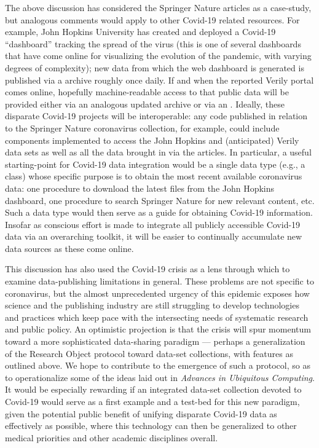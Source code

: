 \documentclass[11pt,letterpaper]{article}
\newcommand{\GIT}{\resizebox{!}{7.5pt}{\AcronymText{GIT}}}
\newcommand{\API}{\resizebox{!}{7.5pt}{\AcronymText{API}}}
\newcommand{\textscc}[1]{{\color{orr!35!black}{{%
						\fontfamily{Cabin-TLF}\fontseries{b}\selectfont{\textsc{\scriptsize{#1}}}}}}}
\newcommand{\AcronymText}[1]{{\textscc{#1}}}
\newcommand{\Cpp}{\resizebox{!}{8.5pt}{\AcronymText{C++}}}
\newcommand{\Cnineteen}{\resizebox{!}{7.5pt}{\AcronymText{CORD-19}}}
\newcommand{\p}[1]{

\vspace{.85em}#1}
\newcommand{\q}[1]{{\fontfamily{qcr}\selectfont ``}#1{\fontfamily{qcr}\selectfont ''}}
\begin{document}
{\p{The above discussion has considered the Springer Nature 
articles as a case-study, but analogous comments would 
apply to other Covid-19 related resources.  For 
example, John Hopkins University has created and deployed 
a Covid-19 \q{dashboard} tracking the spread of the virus 
(this is one of several dashboards that have come online 
for visualizing the evolution of the pandemic, with varying 
degrees of complexity); 
new data from which the web dashboard is generated is published 
via a \GIT{} archive roughly once daily.    If and 
when the reported Verily portal comes online, hopefully 
machine-readable access to that public data will be 
provided either via an analogous updated archive or 
via an \API{}.  Ideally, these disparate Covid-19 
projects will be interoperable: any code published 
in relation to the Springer Nature coronavirus 
collection, for example, could include components 
implemented to access the John Hopkins and 
(anticipated) Verily data sets as well as all 
the data brought in via the \Cnineteen{} articles.  
In particular, a useful starting-point for Covid-19 
data integration would be a single data type 
(e.g., a \Cpp{} class) whose specific purpose is 
to obtain the most recent available coronavirus 
data: one procedure to download the latest 
files from the John Hopkins dashboard, one procedure 
to search Springer Nature for new relevant content, 
etc.  Such a data type would then serve as a 
guide for obtaining Covid-19 information.    
Insofar as conscious effort is made to integrate 
all publicly accessible Covid-19 data via 
an overarching toolkit, it will be easier to continually 
accumulate new data sources as these come online.}

\p{This discussion has also used the Covid-19 crisis as a 
lens through which to examine data-publishing limitations 
in general.  These problems are not specific to 
coronavirus, but the almost unprecedented 
urgency of this epidemic exposes how science and the 
publishing industry are still struggling to 
develop technologies and practices which keep pace 
with the intersecting needs of systematic research 
and public policy.  An optimistic projection is 
that the crisis will spur momentum toward a more 
sophisticated data-sharing paradigm --- perhaps a 
generalization of the Research Object protocol 
toward data-set collections, with features as outlined 
above.  We hope to contribute to the emergence of 
such a protocol, so as to operationalize some 
of the ideas laid out in \textit{Advances in Ubiquitous 
Computing}.  It would be especially rewarding if 
an integrated data-set collection devoted to 
Covid-19 would serve as a first example and a test-bed 
for this new paradigm, given the potential public 
benefit of unifying disparate Covid-19 data 
as effectively as possible, where this technology 
can then be generalized to other medical 
priorities and other academic disciplines overall.}

}
\end{document}
